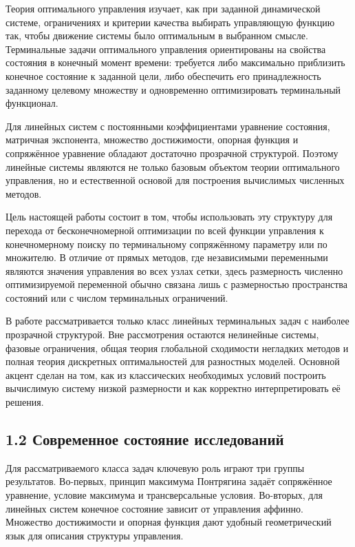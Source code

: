 \documentclass[a4paper,12pt]{article}
\begin{document}
Теория оптимального управления изучает, как при заданной динамической системе, ограничениях и критерии качества выбирать управляющую функцию так, чтобы движение системы было оптимальным в выбранном смысле\cite[с. 13--27]{pontryagin1969}\cite[с. 76--91]{lee1972}\cite[с. 8--15]{blagodatskikh2001}. Терминальные задачи оптимального управления ориентированы на свойства состояния в конечный момент времени: требуется либо максимально приблизить конечное состояние к заданной цели, либо обеспечить его принадлежность заданному целевому множеству и одновременно оптимизировать терминальный функционал.

Для линейных систем с постоянными коэффициентами уравнение состояния, матричная экспонента, множество достижимости, опорная функция и сопряжённое уравнение обладают достаточно прозрачной структурой. Поэтому линейные системы являются не только базовым объектом теории оптимального управления, но и естественной основой для построения вычислимых численных методов.

Цель настоящей работы состоит в том, чтобы использовать эту структуру для перехода от бесконечномерной оптимизации по всей функции управления к конечномерному поиску по терминальному сопряжённому параметру или по множителю\cite[с. 180--190]{kiselev2007}\cite[с. 5--7]{avvakumov1995}. В отличие от прямых методов, где независимыми переменными являются значения управления во всех узлах сетки, здесь размерность численно оптимизируемой переменной обычно связана лишь с размерностью пространства состояний или с числом терминальных ограничений.

В работе рассматривается только класс линейных терминальных задач с наиболее прозрачной структурой. Вне рассмотрения остаются нелинейные системы, фазовые ограничения, общая теория глобальной сходимости негладких методов и полная теория дискретных оптимальностей для разностных моделей. Основной акцент сделан на том, как из классических необходимых условий построить вычислимую систему низкой размерности и как корректно интерпретировать её решения.

\subsection{1.2 Современное состояние исследований}

Для рассматриваемого класса задач ключевую роль играют три группы результатов. Во-первых, принцип максимума Понтрягина задаёт сопряжённое уравнение, условие максимума и трансверсальные условия\cite[с. 23--27]{pontryagin1969}\cite[с. 336--371]{lee1972}\cite{liberzon2012}. Во-вторых, для линейных систем конечное состояние зависит от управления аффинно\cite[с. 15--59]{kiselev2007}. Множество достижимости и опорная функция дают удобный геометрический язык для описания структуры управления\cite[с. 29--37]{blagodatskikh2001}.
\end{document}

